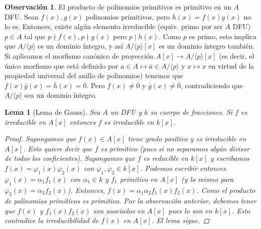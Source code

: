 \documentclass[12pt]{book}
\newtheorem{lem}[teo]{Lema}
\theoremstyle{definition}
\newtheorem{obs}[teo]{Observación}
\begin{document}
\begin{obs}
El producto de polinomios primitivos es primitivo en un $A$ DFU. Sean $f(x),g(x)$ polinomios primitivos, pero $h(x)=f(x)g(x)$ no lo es. Entonces, existe algún elemento irreducible (equiv. primo por ser $A$ DFU) $p\in A$ tal que $p\nmid f(x), p\nmid g(x)$ pero $p\mid h(x)$. Como $p$ es primo, esto implica que $A/\langle p\rangle$ es un dominio íntegro, y así $A/\langle p\rangle [x]$ es un dominio íntegro también. Si aplicamos el morfismo canónico de proyección $A[x]\to A/\langle p\rangle [x]$ (es decir, el único morfismo que está definido por $a\in A\mapsto \overline{a}\in A/\langle p\rangle$ y $x\mapsto x$ en virtud de la propiedad universal del anillo de polinomios) tenemos que $\overline{f}(x)\overline{g}(x) = \overline{h}(x)=\overline{0}$. Pero $\overline{f}(x)\neq \overline{0}$ y $\overline{g}(x)\neq \overline{0}$, contradiciendo que $A/\langle p\rangle$ sea un dominio íntegro.
\end{obs}

\begin{lem}[Lema de Gauss]
Sea $A$ un DFU y $k$ su cuerpo de fracciones. Si $f$ es irreducible en $A[x]$ entonces $f$ es irreducible en $k[x]$.
\begin{proof}
Supongamos que $f(x)\in A[x]$ tiene grado positivo y es irreducible en $A[x]$. Esto quiere decir que $f$ es primitivo (pues si no separamos algún divisor de todos los coeficientes). Supongamos que $f$ es reducible en $k[x]$ y escribamos $f(x) = \varphi_1(x)\varphi_2(x)$ con $\varphi_1,\varphi_2\in k[x]$. Podemos escribir entonces $\varphi_1(x) = \alpha_1 f_1(x)$ con $\alpha_1\in k$ y $f_1$ primitivo en $A[x]$ (y lo mismo para $\varphi_2(x)=\alpha_2 f_2(x)$). Entonces, $f(x) = \alpha_1\alpha_2 f_1(x)f_2(x)$. Como el producto de polinomios primitivos es primitivo. Por la observación anterior, debemos tener que $f(x)$ y $f_1(x)f_2(x)$ son asociados en $A[x]$ pues lo son en $k[x]$. Esto contradice la irreducibilidad de $f(x)$ en $A[x]$. El lema sigue.
\end{proof}
\end{lem}
\end{document}
